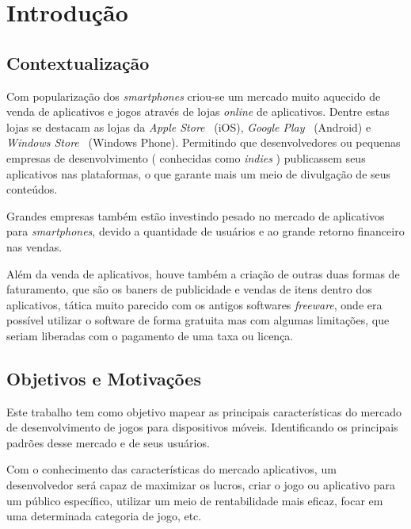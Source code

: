 
\chapter{Introdução}
\label{cap:introducao}


\section{Contextualização}

Com popularização dos \emph{smartphones} criou-se um mercado muito aquecido de venda de aplicativos e jogos através de lojas \emph{online} de aplicativos. Dentre estas lojas se destacam as lojas da \emph{Apple Store}~\cite{appstore} (iOS), \emph{Google Play}~\cite{googleplay} (Android) e \emph{Windows Store}~\cite{windowsphone} (Windows Phone). Permitindo que desenvolvedores ou pequenas empresas de desenvolvimento ( conhecidas como \emph{indies} ) publicassem seus aplicativos nas plataformas, o que garante mais um meio de divulgação de seus conteúdos.


Grandes empresas também estão investindo pesado no mercado de aplicativos para \emph{smartphones}, devido a quantidade de usuários e ao grande retorno financeiro nas vendas.



Além da venda de aplicativos, houve também a criação de outras duas formas de faturamento, que são os baners de publicidade e vendas de itens dentro dos aplicativos, tática muito parecido com os antigos softwares \emph{freeware}, onde era possível utilizar o software de forma gratuita mas com algumas limitações, que seriam liberadas com o pagamento de uma taxa ou licença.







\section{Objetivos e Motivações}

Este trabalho tem como objetivo mapear as principais características do mercado de desenvolvimento de jogos para dispositivos móveis. Identificando os principais padrões desse mercado e de seus usuários.

Com o conhecimento das características do mercado aplicativos, um desenvolvedor será capaz de maximizar os lucros, criar o jogo ou aplicativo para um público específico, utilizar um meio de rentabilidade mais eficaz, focar em uma determinada categoria de jogo, etc.
 

